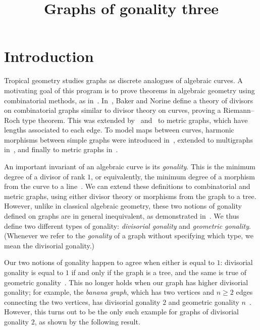 \documentclass[ALCO,ThmDefs,Unicode,epreuves]{cedram}
\author{\firstname{Ivan} \lastname{Aidun}} %
\author{\firstname{Frances} \lastname{Dean}} %
\author{\firstname{Ralph} \lastname{Morrison}} %
\author{\firstname{Teresa} \lastname{Yu}} %
\author{\firstname{Julie} \lastname{Yuan}} %
\title[Graphs of gonality three]{Graphs of gonality three}
\begin{document}
\maketitle

\section{Introduction}
Tropical geometry studies graphs as discrete analogues of algebraic curves. A motivating goal of this program is to prove theorems in algebraic geometry using combinatorial methods, as in~\cite{cdpr}. In~\cite{bn}, Baker and Norine define a theory of divisors on combinatorial graphs similar to divisor theory on curves, proving a Riemann--Roch type theorem. This was extended by~\cite{gk} and~\cite{mz} to metric graphs, which have lengths associated to each edge. To model maps between curves, harmonic morphisms between simple graphs were introduced in~\cite{ura}, extended to multigraphs in~\cite{bn2}, and finally to metric graphs in~\cite{chan}.

An important invariant of an algebraic curve is its \emph{gonality}. This is the minimum degree of a divisor of rank $1$, or equivalently, the minimum degree of a morphism from the curve to a line~\cite[Section~8C]{syzygies}. We can extend these definitions to combinatorial and metric graphs, using either divisor theory or morphisms from the graph to a tree. However, unlike in classical algebraic geometry, these two notions of gonality defined on graphs are in general inequivalent, as demonstrated in~\cite{liyau}. We thus define two different types of gonality: \emph{divisorial gonality} and \emph{geometric gonality}. (Whenever we refer to the \emph{gonality} of a graph without specifying which type, we mean the divisorial gonality.)

Our two notions of gonality happen to agree when either is equal to $1$: divisorial gonality is equal to $1$ if and only if the graph is a tree, and the same is true of geometric gonality~\cite[Lemma~1.1 and Example~3.3]{bn2}. This no longer holds when our graph has higher divisorial gonality; for example, the \emph{banana graph}, which has two vertices and $n\geq 2$ edges connecting the two vertices, has divisorial gonality $2$ and geometric gonality $n$~\cite{liyau}. However, this turns out to be the only such example for graphs of divisorial gonality $2$, as shown by the following result.
\end{document}
